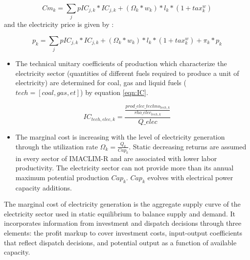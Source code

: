 \begin{dmath}
    Cm_{k} = \sum_{j}{}pIC_{j,k}*IC_{j,k} + (\Omega_{k}*w_{k})*l_{k}*(1+tax_{k}^{w})
    \label{eqn:Cm}
\end{dmath}
and the electricity price is given by : 

\begin{dmath}
    p_{k} = \sum_{j}{}pIC_{j,k}*IC_{j,k} + (\Omega_{k}*w_{k})*l_{k}*(1+tax_{k}^{w}) + \pi_{k} * p_{k}
    \label{eqn:p}
\end{dmath}
\begin{itemize}
    \item The technical unitary coefficients of production which characterize the electricity sector (quantities of different fuels required to produce a unit of electricity) are determined for coal, gas and liquid fuels ($tech = [coal,gas,et]$) by equation \ref{eqn:IC}.
\end{itemize}


\begin{dmath}
    IC_{tech,elec,k} = \frac{\frac{prod\_elec\_techno_{tech,k}}{rho\_elec_{tech,k}}}{Q\_elec}
    \label{eqn:IC}
\end{dmath}

\begin{itemize}
    \item The marginal cost is increasing with the level of electricity generation through the utilization rate $\Omega_{k} = \frac{Q_{k}}{Cap_{k}}$. Static decreasing returns are assumed in every sector of IMACLIM-R and are associated with lower labor productivity. The electricity sector can not provide more than its annual maximum potential production $Cap_{k}$.
$Cap_{k}$ evolves with electrical power capacity additions.
\end{itemize}

The marginal cost of electricity generation is the aggregate supply curve of the electricity sector used in static equilibrium to balance supply and demand. It incorporates information from investment and dispatch decisions through three elements: the profit markup to cover investment costs, input-output coefficients that reflect dispatch decisions, and potential output as a function of available capacity.

